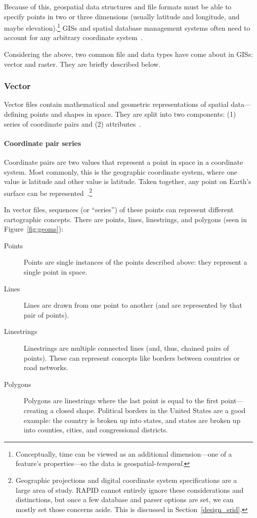 Because of this, geospatial data structures and file formats must be able to specify points in two or three dimensions (usually latitude and longitude, and maybe elevation).\footnote{Conceptually, time can be viewed as an additional dimension---one of a feature's properties---so the data is geospatial-\textit{temporal}.} GISs and spatial database management systems often need to account for any arbitrary coordinate system~\cite{gentle_intro}.

Considering the above, two common file and data types have come about in GISs: vector and raster. They are briefly described below.

\subsubsection{Vector}
\label{sec:vector}
Vector files contain mathematical and geometric representations of spatial data---defining points and shapes in space. They are split into two components: (1) series of coordinate pairs and (2) attributes~\cite{gentle_intro}.

\paragraph{Coordinate pair series}
Coordinate pairs are two values that represent a point in space in a coordinate system. Most commonly, this is the geographic coordinate system, where one value is latitude and other value is latitude. Taken together, any point on Earth's surface can be represented~\cite{gentle_intro}.\footnote{Geographic projections and digital coordinate system specifications are a large area of study. RAPID cannot entirely ignore these considerations and distinctions, but once a few database and parser options are set, we can mostly set those concerns aside. This is discussed in Section~\ref{design_srid}.}

In vector files, sequences (or ``series'') of these points can represent different cartographic concepts. There are points, lines, linestrings, and polygons (seen in Figure~\ref{fig:geoms}):

\begin{description}
  \item[Points] Points are single instances of the points described above: they represent a single point in space.
  \item[Lines] Lines are drawn from one point to another (and are represented by that pair of points).
  \item[Linestrings] Linestrings are multiple connected lines (and, thus, chained pairs of points). These can represent concepts like borders between countries or road networks.
  \item[Polygons] Polygons are linestrings where the last point is equal to the first point---creating a closed shape. Political borders in the United States are a good example: the country is broken up into states, and states are broken up into counties, cities, and congressional districts.
\end{description}

